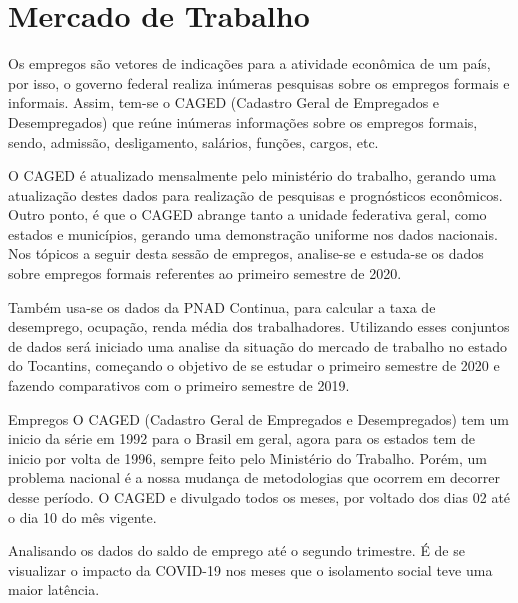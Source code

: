 \chapter{Mercado de Trabalho}

\par Os empregos são  vetores de indicações para a atividade econômica de um país, por isso, o governo federal realiza inúmeras pesquisas sobre os empregos formais e informais. Assim, tem-se o CAGED (Cadastro Geral de Empregados e Desempregados) que reúne inúmeras informações sobre os empregos formais, sendo, admissão, desligamento, salários, funções, cargos, etc.
\par O CAGED é atualizado mensalmente pelo ministério do trabalho, gerando uma atualização destes dados para realização de pesquisas e prognósticos econômicos. Outro ponto, é que o CAGED abrange tanto a unidade federativa geral, como estados e municípios, gerando uma demonstração uniforme nos dados nacionais. Nos tópicos a seguir desta sessão de empregos, analise-se e estuda-se os dados sobre empregos formais referentes ao primeiro semestre de 2020.
\par Também usa-se os dados da PNAD Continua, para calcular a taxa de desemprego, ocupação, renda média dos trabalhadores. Utilizando esses conjuntos de dados será iniciado uma analise da situação do mercado de trabalho no estado do Tocantins, começando  o objetivo de se estudar o primeiro semestre de 2020 e fazendo comparativos com o primeiro semestre de 2019.

\begin{smbox}[label={labelbox},nameref={Empregos}]{Empregos}
O CAGED (Cadastro Geral de Empregados e Desempregados) tem um inicio da série em 1992 para o Brasil em geral, agora para os estados tem de inicio por volta de 1996, sempre feito pelo Ministério do Trabalho. Porém, um problema nacional é a nossa mudança de metodologias que ocorrem em decorrer desse período. O CAGED e divulgado todos os meses, por voltado dos dias 02 até o dia 10 do mês vigente.
\end{smbox}

\par Analisando os dados do saldo de emprego até o segundo trimestre. É de se visualizar o impacto da COVID-19 nos meses que o isolamento social teve uma maior latência.

